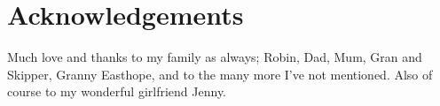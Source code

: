 \section*{Acknowledgements}
Much love and thanks to my family as always; Robin, Dad, Mum, Gran and Skipper, Granny Easthope, and to the many more I've not mentioned. Also of course to my wonderful girlfriend Jenny.
